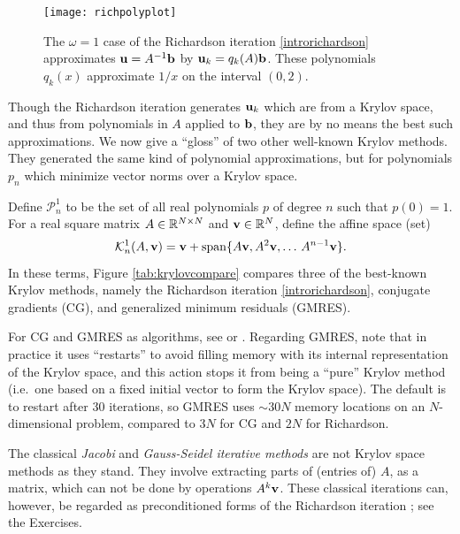 \begin{figure}
\bigskip
\texttt{[image: richpolyplot]}
\caption{The $\omega=1$ case of the Richardson iteration \eqref{introrichardson} approximates $\mathbf{u}=A^{-1}\mathbf{b}$ by $\mathbf{u}_k=q_k(A)\mathbf{b}$.  These polynomials $q_k(x)$ approximate $1/x$ on the interval $(0,2)$.}
\label{fig:richpolyplot}
\end{figure}

Though the Richardson iteration generates $\mathbf{u}_k$ which are from a Krylov space, and thus from polynomials in $A$ applied to $\mathbf{b}$, they are by no means the best such approximations.  We now give a ``gloss'' of two other well-known Krylov methods.  They generated the same kind of polynomial approximations, but for polynomials $p_n$ which minimize vector norms over a Krylov space.

\newcommand{\Pnone}{\mathcal{P}_n^1}
\newcommand{\Kone}[2]{\mathcal{K}_{#1}^1(#2)}
Define $\Pnone$ to be the set of all real polynomials $p$ of degree $n$ such that $p(0)=1$.  For a real square matrix $A \in \mathbb{R}^{N\times N}$ and $\mathbf{v}\in\mathbb{R}^N$, define the affine space (set)
	$$\Kone{n}{A,\bv} = \bv + \Span\{A\bv,A^2\bv,\dots\,A^{n-1}\bv\}.$$
In these terms, Figure \ref{tab:krylovcompare} compares three of the best-known Krylov methods, namely the Richardson iteration \eqref{introrichardson}, conjugate gradients (CG), and generalized minimum residuals (GMRES).  

For CG and GMRES as algorithms, see \citet{Greenbaum1997} or \citet{Saad2003}.  Regarding GMRES, note that in practice it uses ``restarts'' to avoid filling memory with its internal representation of the Krylov space, and this action stops it from being a ``pure'' Krylov method (i.e.~one based on a fixed initial vector to form the Krylov space).  The \PETSc default is to restart after 30 iterations, so GMRES uses $\sim 30N$ memory locations on an $N$-dimensional problem, compared to $3N$ for CG and $2N$ for Richardson.

The classical \emph{Jacobi} and \emph{Gauss-Seidel iterative methods} \citep{Greenbaum1997} are not Krylov space methods as they stand.  They involve extracting parts of (entries of) $A$, as a matrix, which can not be done by operations $A^k\mathbf{v}$.  These classical iterations can, however, be regarded as preconditioned forms of the Richardson iteration \citep{Greenbaum1997}; see the Exercises.

